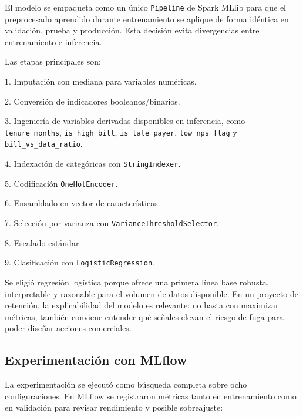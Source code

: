 \documentclass[12pt,a4paper]{article}
\begin{document}
El modelo se empaqueta como un único \nolinkurl{Pipeline} de Spark MLlib para que el preprocesado aprendido durante entrenamiento se aplique de forma idéntica en validación, prueba y producción. Esta decisión evita divergencias entre entrenamiento e inferencia.\par

Las etapas principales son:\par

1. Imputación con mediana para variables numéricas.\par
2. Conversión de indicadores booleanos/binarios.\par
3. Ingeniería de variables derivadas disponibles en inferencia, como \nolinkurl{tenure_months}, \nolinkurl{is_high_bill}, \nolinkurl{is_late_payer}, \nolinkurl{low_nps_flag} y \nolinkurl{bill_vs_data_ratio}.\par
4. Indexación de categóricas con \nolinkurl{StringIndexer}.\par
5. Codificación \nolinkurl{OneHotEncoder}.\par
6. Ensamblado en vector de características.\par
7. Selección por varianza con \nolinkurl{VarianceThresholdSelector}.\par
8. Escalado estándar.\par
9. Clasificación con \nolinkurl{LogisticRegression}.\par

Se eligió regresión logística porque ofrece una primera línea base robusta, interpretable y razonable para el volumen de datos disponible. En un proyecto de retención, la explicabilidad del modelo es relevante: no basta con maximizar métricas, también conviene entender qué señales elevan el riesgo de fuga para poder diseñar acciones comerciales.\par

\subsection{Experimentación con MLflow}

La experimentación se ejecutó como búsqueda completa sobre ocho configuraciones. En MLflow se registraron métricas tanto en entrenamiento como en validación para revisar rendimiento y posible sobreajuste:\par
\end{document}
